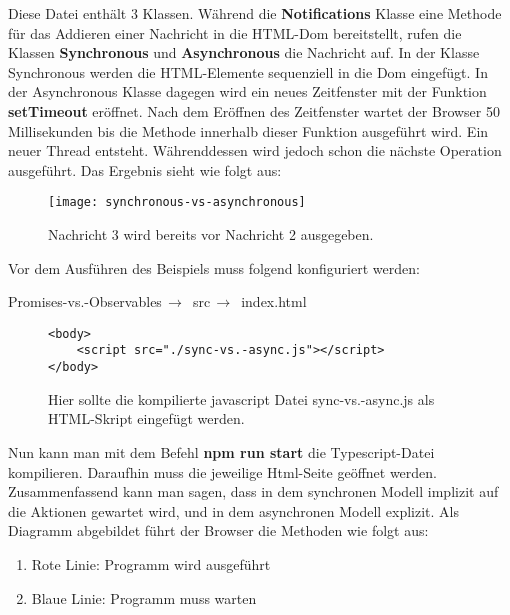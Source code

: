 \noindent
Diese Datei enthält 3 Klassen. Während die \textbf{Notifications} Klasse eine Methode für das Addieren einer Nachricht in die HTML-Dom bereitstellt, rufen die Klassen \textbf{Synchronous} und \textbf{Asynchronous} die Nachricht auf. In der Klasse Synchronous werden die HTML-Elemente sequenziell in die Dom eingefügt. In der Asynchronous Klasse dagegen wird ein neues Zeitfenster mit der Funktion \textbf{setTimeout} eröffnet. Nach dem Eröffnen des Zeitfenster wartet der Browser 50 Millisekunden bis die Methode innerhalb dieser Funktion ausgeführt wird. Ein neuer Thread entsteht. Währenddessen wird jedoch schon die nächste Operation ausgeführt.
Das Ergebnis sieht wie folgt aus:

\begin{figure}[H]
\centering
\texttt{[image: synchronous-vs-asynchronous]}
\caption{Nachricht 3 wird bereits vor Nachricht 2 ausgegeben.}
\end{figure}

\noindent
Vor dem Ausführen des Beispiels muss folgend konfiguriert werden:
 \begin{center}
     Promises-vs.-Observables$\,\to\,$ src$\,\to\,$ index.html
 \end{center}

\begin{figure}[h!]
\begin{lstlisting}
<body>
    <script src="./sync-vs.-async.js"></script>
</body>
\end{lstlisting}
\caption{Hier sollte die kompilierte javascript Datei sync-vs.-async.js als HTML-Skript eingefügt werden.}
\end{figure}

\noindent
Nun kann man mit dem Befehl \textbf{npm run start} die Typescript-Datei kompilieren. Daraufhin muss die jeweilige Html-Seite geöffnet werden. Zusammenfassend kann man sagen, dass in dem synchronen Modell implizit auf die Aktionen gewartet wird, und in dem asynchronen Modell explizit. Als Diagramm abgebildet führt der Browser die Methoden wie folgt aus:

\begin{enumerate} 
\item Rote Linie: Programm wird ausgeführt
\item Blaue Linie: Programm muss warten 
\end{enumerate}





